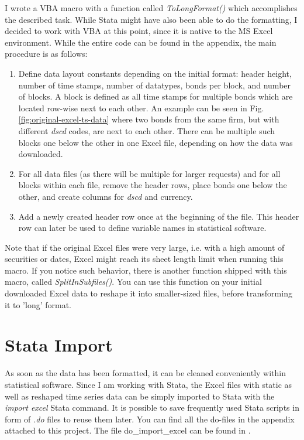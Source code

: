 I wrote a VBA macro with a function called \textit{ToLongFormat()} which accomplishes the described task. While Stata might have also been able to do the formatting, I decided to work with VBA at this point, since it is native to the MS Excel environment. While the entire code can be found in the appendix, %
the main procedure is as follows: 
\begin{enumerate}
	\item Define data layout constants depending on the initial format: header height, number of time stamps, number of datatypes, bonds per block, and number of blocks. A block is defined as all time stamps for multiple bonds which are located row-wise next to each other. An example can be seen in Fig. \ref{fig:original-excel-ts-data} where two bonds from the same firm, but with different \textit{dscd} codes, are next to each other. There can be multiple such blocks one below the other in one Excel file, depending on how the data was downloaded. 
	\item For all data files (as there will be multiple for larger requests) and for all blocks within each file, remove the header rows, place bonds one below the other, and create columns for \textit{dscd} and currency. 
	\item Add a newly created header row once at the beginning of the file. This header row can later be used to define variable names in statistical software. 
\end{enumerate}

Note that if the original Excel files were very large, i.e. with a high amount of securities or dates, Excel might reach its sheet length limit when running this macro. If you notice such behavior, there is another function shipped with this macro, called \textit{SplitInSubfiles()}. You can use this function on your initial downloaded Excel data to reshape it into smaller-sized files, before transforming it to 'long' format. 

\section{Stata Import} \label{section:data-cleaning}
As soon as the data has been formatted, it can be cleaned conveniently within statistical software. Since I am working with Stata, the Excel files with static as well as reshaped time series data can be simply imported to Stata with the  \textit{import excel} Stata command. It is possible to save frequently used Stata scripts in form of \textit{.do} files to reuse them later. You can find all the do-files in the appendix attached to this project. The file do\_import\_excel can be found in . %

